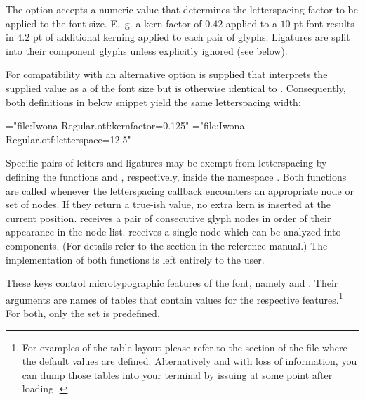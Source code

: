          The option  accepts a numeric value that
         determines the letterspacing factor to be applied to the font
         size.
         E.~g. a kern factor of $0.42$ applied to a $10$ pt font
         results in $4.2$ pt of additional kerning applied to each
         pair of glyphs.
         Ligatures are split into their component glyphs unless
         explicitly ignored (see below).

         For compatibility with \XETEX an alternative
          option is supplied that interprets the
         supplied value as a  of the font size but
         is otherwise identical to .
         Consequently, both definitions in below snippet yield the same
         letterspacing width:

         \beginlisting
\font\iwonakernedA="file:Iwona-Regular.otf:kernfactor=0.125"
\font\iwonakernedB="file:Iwona-Regular.otf:letterspace=12.5"
         \endlisting

         Specific pairs of letters and ligatures may be exempt from
         letterspacing by defining the \LUA functions
          and ,
         respectively, inside the namespace .
         Both functions are called whenever the letterspacing callback
         encounters an appropriate node or set of nodes.
         If they return a true-ish value, no extra kern is inserted at
         the current position.
          receives a pair of consecutive
         glyph nodes in order of their appearance in the node list.
          receives a single node which can be
         analyzed into components.
         (For details refer to the  section in the
         \LUATEX reference manual.)
         The implementation of both functions is left entirely to the
         user.


         These keys control microtypographic features of the font,
         namely  and .
         Their arguments are names of \LUA tables that contain
         values for the respective features.\footnote{%
            For examples of the table layout please refer to the
            section of the file  where the
            default values are defined.
            Alternatively and with loss of information, you can dump
            those tables into your terminal by issuing
            \beginlisting
{}
            \endlisting
            at some point after loading .
         }
         For both, only the set  is predefined.

